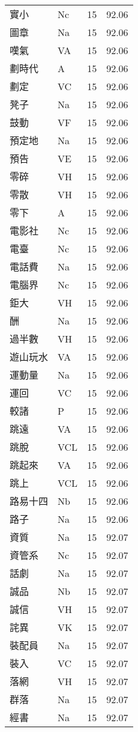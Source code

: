 \documentclass[twocolumn]{book}
\begin{document}
\begin{supertabular}{llrr}
實小 & Nc & 15 &  92.06\\
圖章 & Na & 15 &  92.06\\
嘆氣 & VA & 15 &  92.06\\
劃時代 & A & 15 &  92.06\\
劃定 & VC & 15 &  92.06\\
凳子 & Na & 15 &  92.06\\
鼓動 & VF & 15 &  92.06\\
預定地 & Na & 15 &  92.06\\
預告 & VE & 15 &  92.06\\
零碎 & VH & 15 &  92.06\\
零散 & VH & 15 &  92.06\\
零下 & A & 15 &  92.06\\
電影社 & Nc & 15 &  92.06\\
電臺 & Nc & 15 &  92.06\\
電話費 & Na & 15 &  92.06\\
電腦界 & Nc & 15 &  92.06\\
鉅大 & VH & 15 &  92.06\\
酬 & Na & 15 &  92.06\\
過半數 & VH & 15 &  92.06\\
遊山玩水 & VA & 15 &  92.06\\
運動量 & Na & 15 &  92.06\\
運回 & VC & 15 &  92.06\\
較諸 & P & 15 &  92.06\\
跳遠 & VA & 15 &  92.06\\
跳脫 & VCL & 15 &  92.06\\
跳起來 & VA & 15 &  92.06\\
跳上 & VCL & 15 &  92.06\\
路易十四 & Nb & 15 &  92.06\\
路子 & Na & 15 &  92.06\\
資質 & Na & 15 &  92.07\\
資管系 & Nc & 15 &  92.07\\
話劇 & Na & 15 &  92.07\\
誠品 & Nb & 15 &  92.07\\
誠信 & VH & 15 &  92.07\\
詫異 & VK & 15 &  92.07\\
裝配員 & Na & 15 &  92.07\\
裝入 & VC & 15 &  92.07\\
落網 & VH & 15 &  92.07\\
群落 & Na & 15 &  92.07\\
經書 & Na & 15 &  92.07\\

\end{supertabular}
\end{document}
